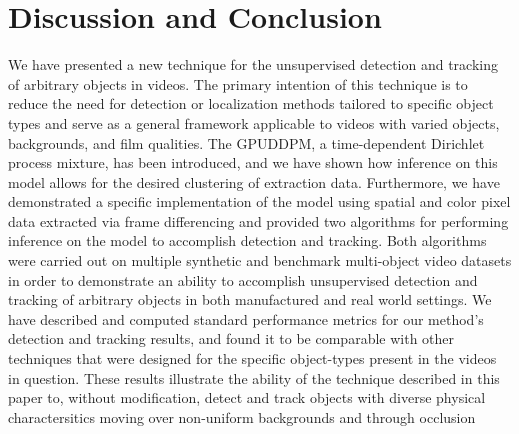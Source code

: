 \documentclass[smallcondensed, final]{svjour3}
\newcommand{\willie}[1]{\textcolor{green}{\textsf{\emph{\textbf{\textcolor{green}{#1}}}}}}
\begin{document}








\section*{Discussion and Conclusion}
\label{sec:discussion}

We have presented a new technique for the unsupervised detection and tracking of arbitrary objects in videos. The primary intention of this technique is to reduce the need for detection or localization methods tailored to specific object types and serve as a general framework applicable to videos with varied objects, backgrounds, and film qualities. The GPUDDPM, a time-dependent Dirichlet process mixture, has been introduced, and we have shown how inference on this model allows for the desired clustering of extraction data. Furthermore, we have demonstrated a specific implementation of the model using spatial and color pixel data extracted via frame differencing and provided two algorithms for performing inference on the model to accomplish detection and tracking. Both algorithms were carried out on multiple synthetic and benchmark multi-object video datasets in order to demonstrate an ability to accomplish unsupervised detection and tracking of arbitrary objects in both manufactured and real world settings. We have described and computed standard performance metrics for our method's detection and tracking results, and found it to be comparable with other techniques that were designed for the specific object-types present in the videos in question. These results illustrate the ability of the technique described in this paper to, without modification, detect and track objects with diverse physical charactersitics moving over non-uniform backgrounds and through occlusion
\end{document}
